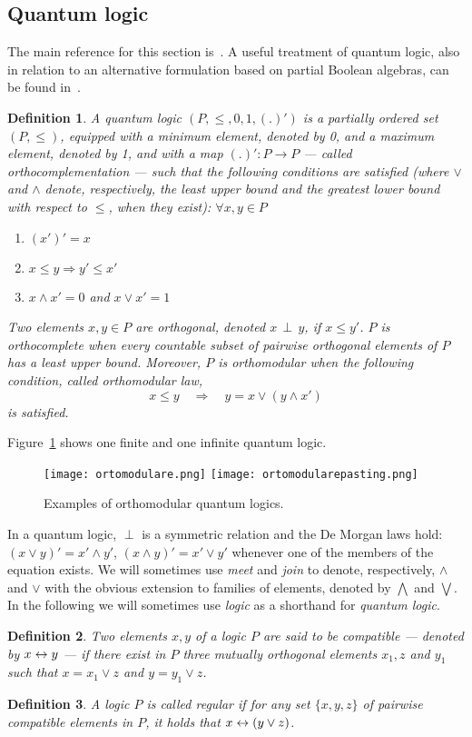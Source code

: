 \documentclass{eptcs}
\newcommand{\comp}{\mathrel{\smash{\leftrightarrow}}} \newcommand{\cuts}[1]{\mathcal{C}(#1)}         \newcommand{\lines}[1]{\mathcal{L}(#1)}        \newcommand{\CC}[1]{\Gamma(#1)}            \newcommand{\LL}[1]{\mathbf{L}(#1)}            \newcommand{\qed}{\quad$\Box$}
\newtheorem{definition}{Definition}
\begin{document}
\subsection{Quantum logic}
The main reference for this section is~\cite{PP91}. A useful
treatment of quantum logic, also in relation to an alternative
formulation based on partial Boolean algebras, can be found
in~\cite{H89}.
\begin{definition} \cite{PP91}
  A \emph{quantum logic} $(P, \leq, 0,
    1,(.)')$ is a partially ordered set $(P, \leq)$, equipped with
    a minimum element, denoted by 0, and a maximum element, denoted
  by 1, and with a map
  $(.)':P \rightarrow P$ --- called
  \emph{orthocomplementation} --- such that the following
  conditions are satisfied (where $\lor$ and $\land$ denote,
  respectively, the least upper bound and the greatest lower bound
  with respect to $ \leq $, when they exist):
  $\forall x, y \in P$
  \begin{enumerate}
    \item  $(x')'  = x$
    \item  $x \leq y    \Rightarrow y' \leq x'$
    \item  $x \land x'  = 0$ and $x \lor x'  = 1$
  \end{enumerate}
  Two elements $x, y \in P$ are \emph{orthogonal}, denoted $x\, \perp
  \, y$, if $x \leq y'$. $P$ is \emph{orthocomplete} when
  every countable subset of pairwise orthogonal elements of $P$ has a least upper
  bound. Moreover, $P$ is \emph{orthomodular} when the
  following condition, called \emph{orthomodular law},
  \[
    x \leq y\quad  \Rightarrow\quad y = x \lor (y \land x')
  \]
  is satisfied.
\end{definition}
Figure~\ref{f:orthoql} shows one finite and one infinite quantum logic.
\begin{figure}
  \begin{center}
\texttt{[image: ortomodulare.png]}
\quad\quad
\texttt{[image: ortomodularepasting.png]}
  \end{center}
  \caption{Examples of orthomodular quantum logics.}\label{f:orthoql}
\end{figure}
In a quantum logic, $\perp $ is a symmetric relation and the De
Morgan laws hold: 
$(x \lor y)'= x' \land y'$, $(x \land y)'= x' \lor y'$
whenever one of the members of the equation exists.
We will sometimes use \emph{meet} and
\emph{join} to denote, respectively, $\land$ and $\lor$ with the
obvious extension to families of elements, denoted by $\bigwedge$ and
$\bigvee$. In the following we will sometimes use \emph{logic} as a shorthand
for \emph{quantum logic}.
\begin{definition}
Two elements $x, y$ of a logic $P$ are said to be
\emph{compatible} --- denoted by $x\comp y$ --- if there exist in
$P$ three mutually orthogonal elements $x_1, z$ and $y_1$
such that $x=x_1\lor z$ and $y=y_1\lor z$.
\end{definition}
\begin{definition}
A logic $P$ is called \emph{regular} if for any set
$\{x, y, z\}$ of pairwise compatible elements in $P$,
it holds that $x\comp (y \lor z)$.
\end{definition}
\end{document}
